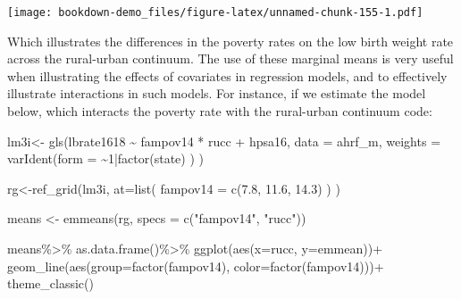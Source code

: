 \documentclass[
]{article}
\newenvironment{Shaded}{\begin{snugshade}}{\end{snugshade}}
\newcommand{\AttributeTok}[1]{\textcolor[rgb]{0.77,0.63,0.00}{#1}}
\newcommand{\DecValTok}[1]{\textcolor[rgb]{0.00,0.00,0.81}{#1}}
\newcommand{\FloatTok}[1]{\textcolor[rgb]{0.00,0.00,0.81}{#1}}
\newcommand{\FunctionTok}[1]{\textcolor[rgb]{0.00,0.00,0.00}{#1}}
\newcommand{\NormalTok}[1]{#1}
\newcommand{\OtherTok}[1]{\textcolor[rgb]{0.56,0.35,0.01}{#1}}
\newcommand{\SpecialCharTok}[1]{\textcolor[rgb]{0.00,0.00,0.00}{#1}}
\newcommand{\StringTok}[1]{\textcolor[rgb]{0.31,0.60,0.02}{#1}}
\begin{document}
\texttt{[image: bookdown-demo\_files/figure-latex/unnamed-chunk-155-1.pdf]}

Which illustrates the differences in the poverty rates on the low birth weight rate across the rural-urban continuum. The use of these marginal means is very useful when illustrating the effects of covariates in regression models, and to effectively illustrate interactions in such models. For instance, if we estimate the model below, which interacts the poverty rate with the rural-urban continuum code:

\begin{Shaded}
\begin{Highlighting}[]
\NormalTok{lm3i}\OtherTok{\textless{}{-}} \FunctionTok{gls}\NormalTok{(lbrate1618 }\SpecialCharTok{\textasciitilde{}}\NormalTok{  fampov14 }\SpecialCharTok{*}\NormalTok{ rucc }\SpecialCharTok{+}\NormalTok{ hpsa16,}
          \AttributeTok{data =}\NormalTok{ ahrf\_m, }
          \AttributeTok{weights =} \FunctionTok{varIdent}\NormalTok{(}\AttributeTok{form =} \SpecialCharTok{\textasciitilde{}}\DecValTok{1}\SpecialCharTok{|}\FunctionTok{factor}\NormalTok{(state) ) )}
\end{Highlighting}
\end{Shaded}

\begin{Shaded}
\begin{Highlighting}[]
\NormalTok{rg}\OtherTok{\textless{}{-}}\FunctionTok{ref\_grid}\NormalTok{(lm3i,}
             \AttributeTok{at=}\FunctionTok{list}\NormalTok{( }\AttributeTok{fampov14 =} \FunctionTok{c}\NormalTok{(}\FloatTok{7.8}\NormalTok{, }\FloatTok{11.6}\NormalTok{, }\FloatTok{14.3}\NormalTok{) ) )}

\NormalTok{means }\OtherTok{\textless{}{-}} \FunctionTok{emmeans}\NormalTok{(rg, }\AttributeTok{specs =} \FunctionTok{c}\NormalTok{(}\StringTok{"fampov14"}\NormalTok{, }\StringTok{"rucc"}\NormalTok{))}

\NormalTok{means}\SpecialCharTok{\%\textgreater{}\%}
  \FunctionTok{as.data.frame}\NormalTok{()}\SpecialCharTok{\%\textgreater{}\%}
  \FunctionTok{ggplot}\NormalTok{(}\FunctionTok{aes}\NormalTok{(}\AttributeTok{x=}\NormalTok{rucc, }\AttributeTok{y=}\NormalTok{emmean))}\SpecialCharTok{+}
  \FunctionTok{geom\_line}\NormalTok{(}\FunctionTok{aes}\NormalTok{(}\AttributeTok{group=}\FunctionTok{factor}\NormalTok{(fampov14), }\AttributeTok{color=}\FunctionTok{factor}\NormalTok{(fampov14)))}\SpecialCharTok{+}
  \FunctionTok{theme\_classic}\NormalTok{()}
\end{Highlighting}
\end{Shaded}
\end{document}
